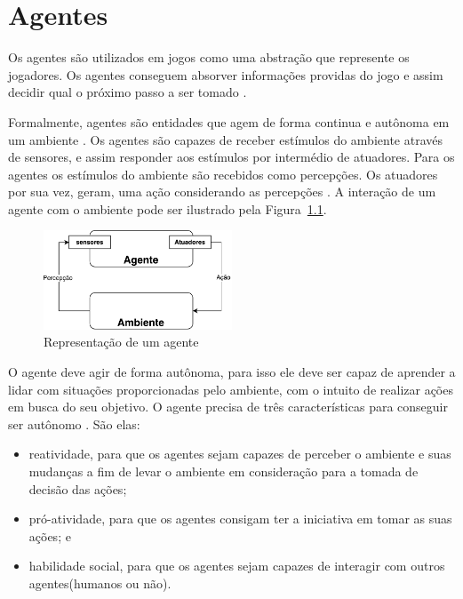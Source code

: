 \chapter{\label{chap:agentes}Agentes} 


Os agentes são utilizados em jogos como uma abstração que represente os jogadores. Os agentes conseguem absorver informações providas do jogo e assim decidir qual o próximo passo a ser tomado \cite{millington2009artificial}. 

Formalmente, agentes são entidades que agem de forma continua e autônoma em um ambiente \cite{agent1993oriented}. 
Os agentes são capazes de receber estímulos do ambiente através de sensores, e assim responder aos estímulos por intermédio de atuadores. 
Para os agentes os estímulos do ambiente são recebidos como percepções. 
Os atuadores por sua vez, geram, uma ação considerando as percepções \cite{intelligence2003modern}. 
A interação de um agente com o ambiente pode ser ilustrado pela Figura~\ref{fig:agente}.

\begin{figure}[ht]
	\centering
	\includegraphics[width=0.5\textwidth]{fig/agente.pdf}
	\caption{Representação de um agente}
	\label{fig:agente}
\end{figure} 

O agente deve agir de forma autônoma, para isso ele deve ser capaz de aprender a lidar com situações proporcionadas pelo ambiente, com o intuito de realizar ações em busca do seu objetivo. O agente precisa de três características para conseguir ser autônomo \cite{agent1999}. São elas:
 
\begin{itemize}
	\item reatividade, para que os agentes sejam capazes de perceber o ambiente e suas mudanças a fim de levar o ambiente em consideração para a tomada de decisão das ações;
	\item pró-atividade, para que os agentes consigam ter a iniciativa em tomar as suas ações; e
	\item habilidade social, para que os agentes sejam capazes de interagir com outros agentes(humanos ou não).
\end{itemize}

